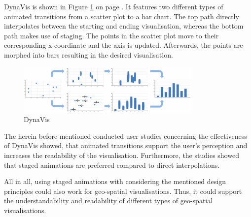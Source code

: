 DynaVis is shown in Figure \ref{fig:dynavis} on page \pageref{fig:dynavis}. It features two different types of animated transitions from a scatter plot to a bar chart. The top path directly interpolates between the starting and ending visualisation, whereas the bottom path makes use of staging. The points in the scatter plot move to their corresponding x-coordinate and the axis is updated. Afterwards, the points are morphed into bars resulting in the desired visualisation.
\cbend

\begin{figure}[!htb]
\centering
\includegraphics[width=0.8\textwidth, keepaspectratio]{images/methods/related/dynavis.png}
\caption[
    DynaVis .
]{DynaVis}
\label{fig:dynavis}
\end{figure}

\cbstart
The herein before mentioned conducted user studies concerning the effectiveness of DynaVis showed, that animated transitions support the user's perception and increases the readability of the visualisation. Furthermore, the studies showed that staged animations are preferred compared to direct interpolations.

All in all, using staged animations with considering the mentioned design principles could also work for geo-spatial visualisations. Thus, it could support the understandability and readability of different types of geo-spatial visualisations.
\cbend